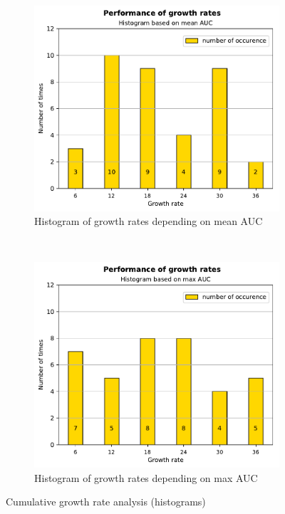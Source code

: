 \begin{figure}
    \centering
    \begin{subfigure}[b]{0.4\textwidth}
        \includegraphics[width=\textwidth]{images/densenet/siamese/densenet_siamese_gr_mean_bar}
        \caption{Histogram of growth rates depending on mean AUC}
        \label{fig:mean_auc_histogram}
    \end{subfigure}
    ~ %
    \begin{subfigure}[b]{0.4\textwidth}
        \includegraphics[width=\textwidth]{images/densenet/siamese/densenet_siamese_gr_max_bar}
        \caption{Histogram of growth rates depending on max AUC}
        \label{fig:max_auc_histogram}
    \end{subfigure}    
    \caption[Cumulative growth rate analysis (histograms)]{Cumulative growth rate analysis (histograms) }
    \label{fig:growthrate_histogram}
\end{figure}

